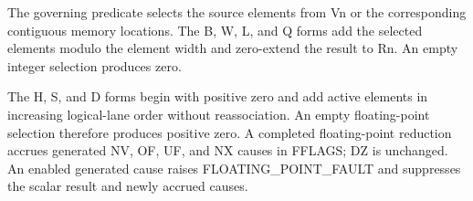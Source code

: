 The governing predicate selects the source elements from Vn or the
corresponding contiguous memory locations. The B, W, L, and Q forms add the
selected elements modulo the element width and zero-extend the result to Rn.
An empty integer selection produces zero.

The H, S, and D forms begin with positive zero and add active elements in
increasing logical-lane order without reassociation. An empty floating-point
selection therefore produces positive zero. A completed floating-point
reduction accrues generated NV, OF, UF, and NX causes in FFLAGS; DZ is
unchanged. An enabled generated cause raises FLOATING\_POINT\_FAULT and
suppresses the scalar result and newly accrued causes.
